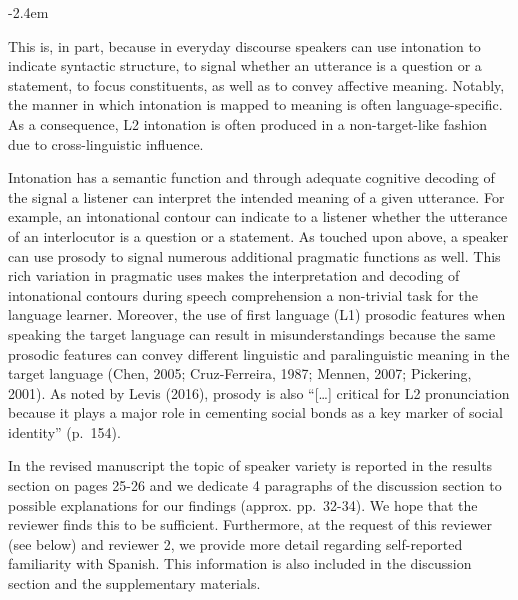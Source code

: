 \documentclass[]{article}
\renewenvironment{quote}{\begin{fquote}\advance\leftmargini -2.4em\begin{oldquote}}{\end{oldquote}\end{fquote}}
\newenvironment{fquote}
  {\def\FrameCommand{
	\fboxsep=0.6em %
	\fcolorbox{black}{white}}%
    \MakeFramed {\advance\hsize-2\width \FrameRestore}
    \begin{minipage}{\linewidth}
  }
  {\end{minipage}\endMakeFramed}
\newcommand{\TaskEstimationBox}[2]{%
\ifoptiondraft{\parbox{1.0\linewidth}{\hfill \hfill {\colorbox{#2}{\color{White} \textbf{#1}}}}}%
{}%
}
\def\Done {\TaskEstimationBox{Done}{Blue}}
\def\Easy {\TaskEstimationBox{Feasible}{ForestGreen}}
\begin{document}
\begin{quote}
This is, in part, because in everyday discourse speakers can use intonation to indicate syntactic structure, to signal whether an utterance is a question or a statement, to focus constituents, as well as to convey affective meaning.
Notably, the manner in which intonation is mapped to meaning is often language-specific.
As a consequence, L2 intonation is often produced in a non-target-like fashion due to cross-linguistic influence.

Intonation has a semantic function and through adequate cognitive decoding of the signal a listener can interpret the intended meaning of a given utterance.
For example, an intonational contour can indicate to a listener whether the utterance of an interlocutor is a question or a statement.
As touched upon above, a speaker can use prosody to signal numerous additional pragmatic functions as well.
This rich variation in pragmatic uses makes the interpretation and decoding of intonational contours during speech comprehension a non-trivial task for the language learner.
Moreover, the use of first language (L1) prosodic features when speaking the target language can result in misunderstandings because the same prosodic features can convey different linguistic and paralinguistic meaning in the target language (Chen, 2005; Cruz-Ferreira, 1987; Mennen, 2007; Pickering, 2001).
As noted by Levis (2016), prosody is also ``{[}\ldots{]} critical for L2 pronunciation because it plays a major role in cementing social bonds as a key marker of social identity'' (p.~154).
\end{quote}

\Done
\Easy


In the revised manuscript the topic of speaker variety is reported in the results section on pages 25-26 and we dedicate 4 paragraphs of the discussion section to possible explanations for our findings (approx. pp.~32-34).
We hope that the reviewer finds this to be sufficient.
Furthermore, at the request of this reviewer (see below) and reviewer 2, we provide more detail regarding self-reported familiarity with Spanish.
This information is also included in the discussion section and the supplementary materials.
\end{document}
